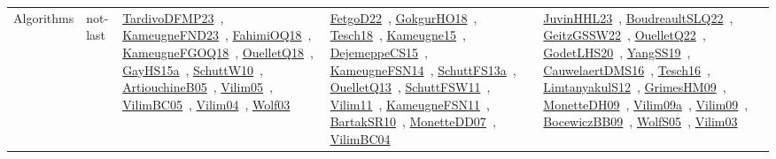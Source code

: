 {\begin{longtable}{lp{3cm}>{\raggedright\arraybackslash}p{6cm}>{\raggedright\arraybackslash}p{6cm}>{\raggedright\arraybackslash}p{8cm}}
Algorithms & not-last & \href{works/TardivoDFMP23.pdf}{TardivoDFMP23}~\cite{TardivoDFMP23}, \href{works/KameugneFND23.pdf}{KameugneFND23}~\cite{KameugneFND23}, \href{works/FahimiOQ18.pdf}{FahimiOQ18}~\cite{FahimiOQ18}, \href{works/KameugneFGOQ18.pdf}{KameugneFGOQ18}~\cite{KameugneFGOQ18}, \href{works/OuelletQ18.pdf}{OuelletQ18}~\cite{OuelletQ18}, \href{works/GayHS15a.pdf}{GayHS15a}~\cite{GayHS15a}, \href{works/SchuttW10.pdf}{SchuttW10}~\cite{SchuttW10}, \href{works/ArtiouchineB05.pdf}{ArtiouchineB05}~\cite{ArtiouchineB05}, \href{works/Vilim05.pdf}{Vilim05}~\cite{Vilim05}, \href{works/VilimBC05.pdf}{VilimBC05}~\cite{VilimBC05}, \href{works/Vilim04.pdf}{Vilim04}~\cite{Vilim04}, \href{works/Wolf03.pdf}{Wolf03}~\cite{Wolf03} & \href{works/FetgoD22.pdf}{FetgoD22}~\cite{FetgoD22}, \href{works/GokgurHO18.pdf}{GokgurHO18}~\cite{GokgurHO18}, \href{works/Tesch18.pdf}{Tesch18}~\cite{Tesch18}, \href{works/Kameugne15.pdf}{Kameugne15}~\cite{Kameugne15}, \href{works/DejemeppeCS15.pdf}{DejemeppeCS15}~\cite{DejemeppeCS15}, \href{works/KameugneFSN14.pdf}{KameugneFSN14}~\cite{KameugneFSN14}, \href{works/SchuttFS13a.pdf}{SchuttFS13a}~\cite{SchuttFS13a}, \href{works/OuelletQ13.pdf}{OuelletQ13}~\cite{OuelletQ13}, \href{works/SchuttFSW11.pdf}{SchuttFSW11}~\cite{SchuttFSW11}, \href{works/Vilim11.pdf}{Vilim11}~\cite{Vilim11}, \href{works/KameugneFSN11.pdf}{KameugneFSN11}~\cite{KameugneFSN11}, \href{works/BartakSR10.pdf}{BartakSR10}~\cite{BartakSR10}, \href{works/MonetteDD07.pdf}{MonetteDD07}~\cite{MonetteDD07}, \href{works/VilimBC04.pdf}{VilimBC04}~\cite{VilimBC04} & \href{works/JuvinHHL23.pdf}{JuvinHHL23}~\cite{JuvinHHL23}, \href{works/BoudreaultSLQ22.pdf}{BoudreaultSLQ22}~\cite{BoudreaultSLQ22}, \href{works/GeitzGSSW22.pdf}{GeitzGSSW22}~\cite{GeitzGSSW22}, \href{works/OuelletQ22.pdf}{OuelletQ22}~\cite{OuelletQ22}, \href{works/GodetLHS20.pdf}{GodetLHS20}~\cite{GodetLHS20}, \href{works/YangSS19.pdf}{YangSS19}~\cite{YangSS19}, \href{works/CauwelaertDMS16.pdf}{CauwelaertDMS16}~\cite{CauwelaertDMS16}, \href{works/Tesch16.pdf}{Tesch16}~\cite{Tesch16}, \href{works/LimtanyakulS12.pdf}{LimtanyakulS12}~\cite{LimtanyakulS12}, \href{works/GrimesHM09.pdf}{GrimesHM09}~\cite{GrimesHM09}, \href{works/MonetteDH09.pdf}{MonetteDH09}~\cite{MonetteDH09}, \href{works/Vilim09a.pdf}{Vilim09a}~\cite{Vilim09a}, \href{works/Vilim09.pdf}{Vilim09}~\cite{Vilim09}, \href{works/BocewiczBB09.pdf}{BocewiczBB09}~\cite{BocewiczBB09}, \href{works/WolfS05.pdf}{WolfS05}~\cite{WolfS05}, \href{works/Vilim03.pdf}{Vilim03}~\cite{Vilim03}\\

\end{longtable}}
